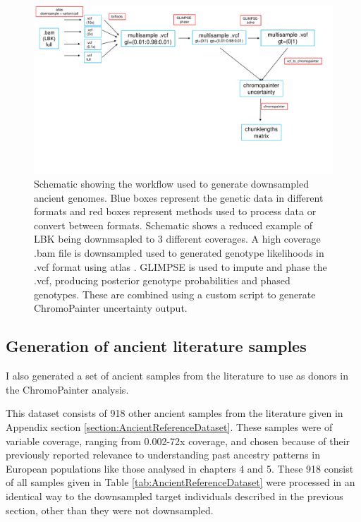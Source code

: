 {\begin{figure}[htp]
    \centering
    \includegraphics[width=1.0\textwidth]{../images/chapter1/workflow.pdf}
    \caption{Schematic showing the workflow used to generate downsampled ancient genomes. Blue boxes represent the genetic data in different formats and red boxes represent methods used to process data or convert between formats. Schematic shows a reduced example of LBK being downmsapled to 3 different coverages. A high coverage .bam file is downsampled used to generated genotype likelihoods in .vcf format using atlas \cite{Link2017}. GLIMPSE is used to impute and phase the .vcf, producing posterior genotype probabilities and phased genotypes. These are combined using a custom script to generate ChromoPainter uncertainty output.}
    \label{fig:Sensitivity_downsampled_rtgtools}
\end{figure}

\subsection{Generation of ancient literature samples} \label{AncientReferenceSamples}

I also generated a set of ancient samples from the literature to use as donors in the ChromoPainter analysis.

This dataset consists of 918 other ancient samples from the literature given in Appendix section \ref{section:AncientReferenceDataset}. These samples were of variable coverage, ranging from 0.002-72x coverage, and chosen because of their previously reported relevance to understanding past ancestry patterns in European populations like those analysed in chapters 4 and 5. These 918 consist of all samples given in Table \ref{tab:AncientReferenceDataset} were processed in an identical way to the downsampled target individuals described in the previous section, other than they were not downsampled.  

}
